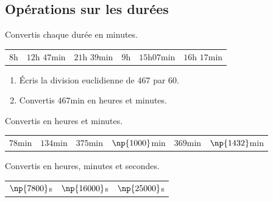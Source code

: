 \documentclass[a4paper,10pt]{report}
\begin{document}
\subsection*{Opérations sur les durées}

\begin{ex}
Convertis chaque durée en minutes.
\begin{enumerate}
\begin{tabular}{m{2.3cm}m{2.3cm}m{2.3cm}m{2.3cm}m{2.3cm}m{2.3cm}}
\item $8$h&
\item $12$h $47$min&
\item $21$h $39$min&
\item $9$h&
\item $15$h$07$min&
\item $16$h $17$min\\
\end{tabular}
\end{enumerate}
\end{ex}

\begin{ex}

\medskip
\begin{enumerate}
\item Écris la division euclidienne de $467$ par $60$.
\item Convertis $467$min en heures et minutes.
\end{enumerate}
\end{ex}

\begin{ex}
Convertis en heures et minutes.
\begin{enumerate}
\begin{tabular}{m{2.3cm}m{2.3cm}m{2.3cm}m{2.3cm}m{2.3cm}m{2.3cm}}
\item $78$min&
\item $134$min&
\item $375$min&
\item $\np{1 000}$min&
\item $369$min&
\item $\np{1 432}$min\\
\end{tabular}
\end{enumerate}
\end{ex}

\begin{ex}
Convertis en heures, minutes et secondes.
\begin{enumerate}
\begin{tabular}{m{5cm}m{5cm}m{5cm}}
\item $\np{7 800}$s&
\item $\np{16 000}$s&
\item $\np{25 000}$s\\
\end{tabular}
\end{enumerate}
\end{ex}
\end{document}
